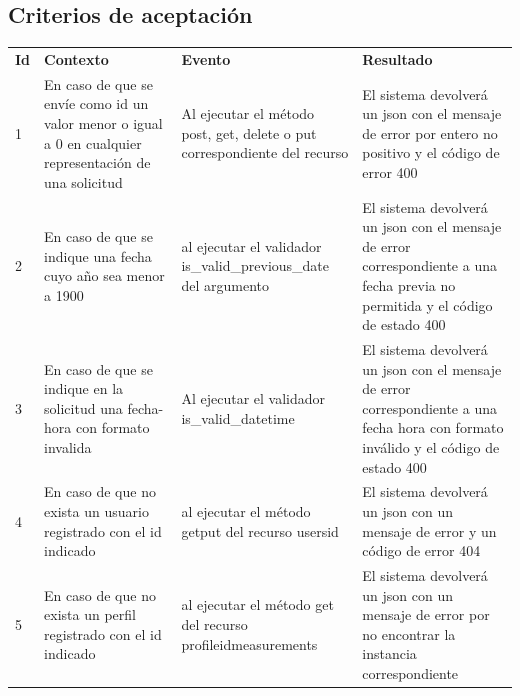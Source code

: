 \documentclass[a4paper,12pt]{article}
\begin{document}

\subsection{Criterios de aceptación}

\begin{center}
\begin{longtable}{|p{0.5cm}|p{4cm}|p{4cm}|p{5cm}|}
\hline \hline \rowcolor[gray]{0.9}
	\multicolumn{4}{||c|}{\textbf{Criterio de aceptación}} \\
    \hline  \rowcolor[gray]{0.9}
        \textbf{Id} &
        \textbf{Contexto} &
        \textbf{Evento}&
        \textbf{Resultado} \\
    \hline
1&En caso de que se envíe como id un valor menor o igual a 0 en cualquier representación  de una solicitud & Al ejecutar el método post, get, delete o put correspondiente del recurso & El sistema devolverá un json con el mensaje de error por entero no positivo y el código de error 400 \\ \hline
	\hline
2&En caso de que se indique una fecha cuyo año sea menor a 1900 & al ejecutar el validador is\_valid\_previous\_date del argumento  & El sistema devolverá un json con el mensaje de error correspondiente a una fecha previa no permitida y el código de estado 400 \\ 		\hline
	\hline
3&En caso de que se indique en la solicitud una fecha-hora con formato invalida & Al ejecutar el validador is\_valid\_datetime  & El sistema devolverá un json con el mensaje de error correspondiente a una fecha hora con formato inválido y el código de estado 400\\ \hline
    \hline
4&En caso de que no exista un usuario registrado con el id indicado & al ejecutar el método get\/put del recurso \/users\/id  & El sistema devolverá un json con un mensaje de error y un código de error 404 \\ \hline
	\hline
5&En caso de que no exista un perfil registrado con el id indicado & al ejecutar el método get del recurso \/profile\/id\/measurements  & El sistema devolverá un json con un mensaje de error por no encontrar la instancia correspondiente \\ \hline

  \end{longtable}
\end{center}
\end{document}
